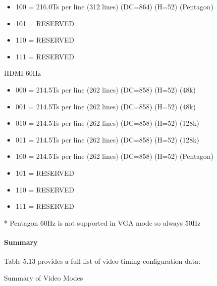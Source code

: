 \begin{itemize}
\begin{itemize}
  \item[] 100 = 216.0Ts per line (312 lines) (DC=864) (H=52) (Pentagon)
  \item[] 101 = RESERVED
  \item[] 110 = RESERVED
  \item[] 111 = RESERVED
  \end{itemize}
    HDMI 60Hz
  \begin{itemize}
  \item[] 000 = 214.5Ts per line (262 lines) (DC=858) (H=52) (48k)
  \item[] 001 = 214.5Ts per line (262 lines) (DC=858) (H=52) (48k)
  \item[] 010 = 214.5Ts per line (262 lines) (DC=858) (H=52) (128k)
  \item[] 011 = 214.5Ts per line (262 lines) (DC=858) (H=52) (128k)
  \item[] 100 = 214.5Ts per line (262 lines) (DC=858) (H=52) (Pentagon)
  \item[] 101 = RESERVED
  \item[] 110 = RESERVED
  \item[] 111 = RESERVED
  \end{itemize}
\end{itemize}

* Pentagon 60Hz is not supported in VGA mode so always 50Hz
      
\paragraph{Summary}

Table 5.13 provides a full list of video timing configuration
data:

\begin{table}[h]\centering
  \caption{Summary of Video Modes}
\end{table}




